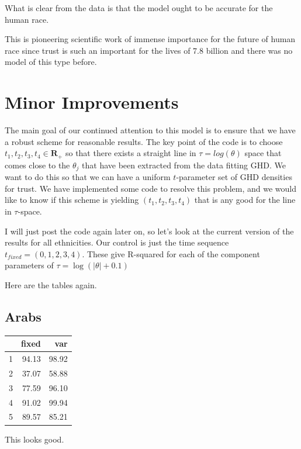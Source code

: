 \documentclass{amsart}
\begin{document}
What is clear from the data is that the model ought to be accurate for the human race.

This is pioneering scientific work of immense importance for the future of human race since trust is such an important for the lives of 7.8 billion and there was no model of this type before.

\section{Minor Improvements}

The main goal of our continued attention to this model is to ensure that we have a robust scheme for reasonable results.  The key point of the code is to choose $t_1,t_2,t_3,t_4 \in \mathbf{R}_+$ so that there exists a straight line in $\tau=log(\theta)$ space that comes close to the $\theta_j$ that have been extracted from the data fitting GHD.  We want to do this so that we can have a uniform $t$-parameter set of GHD densities for trust.  We have implemented some code to resolve this problem, and we would like to know if this scheme is yielding $(t_1,t_2,t_3,t_4)$ that is any good for the line in $\tau$-space.

I will just post the code again later on, so let's look at the current version of the results for all ethnicities.  Our control is just the time sequence $t_{fixed} = (0,1,2,3,4)$.  These give R-squared for each of the component parameters of $\tau=\log(|\theta| + 0.1)$

Here are the tables again. 

\subsection{Arabs}
\begin{table}[ht]
\centering
\begin{tabular}{rrr}
  \hline
 & fixed & var \\ 
  \hline
1 & 94.13 & 98.92 \\ 
  2 & 37.07 & 58.88 \\ 
  3 & 77.59 & 96.10 \\ 
  4 & 91.02 & 99.94 \\ 
  5 & 89.57 & 85.21 \\ 
   \hline
\end{tabular}
\end{table}

This looks good.
\end{document}
